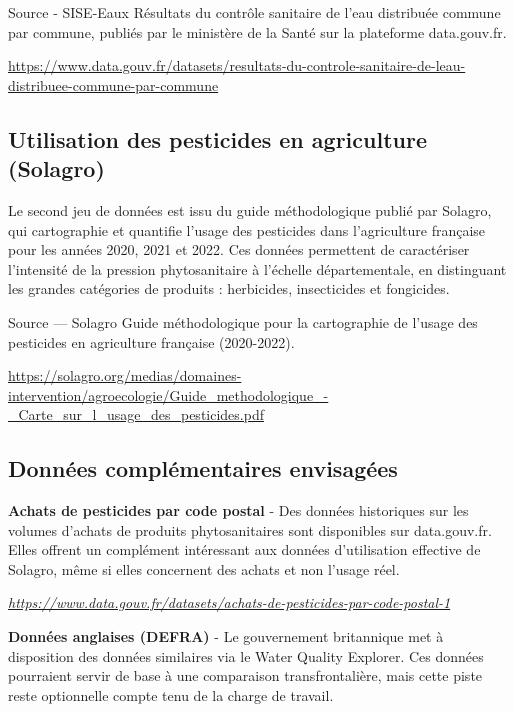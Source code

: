 \documentclass[a4paper,11pt]{article}
\begin{document}
\begin{sourcebox}{Source - SISE-Eaux}
Résultats du contrôle sanitaire de l'eau distribuée commune par commune, publiés par le ministère de la Santé sur la plateforme data.gouv.fr.\par\smallskip
\url{https://www.data.gouv.fr/datasets/resultats-du-controle-sanitaire-de-leau-distribuee-commune-par-commune}
\end{sourcebox}


\subsection{Utilisation des pesticides en agriculture (Solagro)}

Le second jeu de données est issu du guide méthodologique publié par Solagro, qui cartographie et quantifie l'usage des pesticides dans l'agriculture française pour les années 2020, 2021 et 2022. Ces données permettent de caractériser l'intensité de la pression phytosanitaire à l'échelle départementale, en distinguant les grandes catégories de produits : herbicides, insecticides et fongicides.

\begin{sourcebox}{Source — Solagro}
Guide méthodologique pour la cartographie de l'usage des pesticides en agriculture française (2020-2022).\par\smallskip
\url{https://solagro.org/medias/domaines-intervention/agroecologie/Guide_methodologique_-_Carte_sur_l_usage_des_pesticides.pdf}
\end{sourcebox}

\subsection{Données complémentaires envisagées}

\textbf{Achats de pesticides par code postal} - Des données historiques sur les volumes d'achats de produits phytosanitaires sont disponibles sur data.gouv.fr. Elles offrent un complément intéressant aux données d'utilisation effective de Solagro, même si elles concernent des achats et non l'usage réel.

{\color{txtgrey}\itshape\small \url{https://www.data.gouv.fr/datasets/achats-de-pesticides-par-code-postal-1}}

\medskip

\textbf{Données anglaises (DEFRA)} - Le gouvernement britannique met à disposition des données similaires via le Water Quality Explorer. Ces données pourraient servir de base à une comparaison transfrontalière, mais cette piste reste optionnelle compte tenu de la charge de travail.
\end{document}
